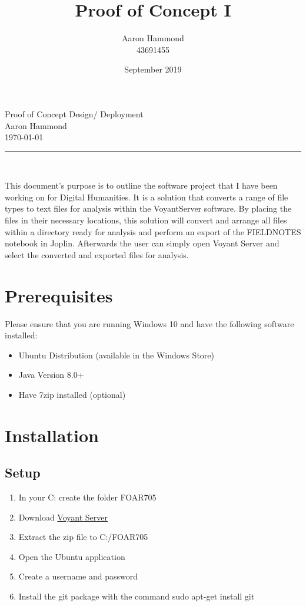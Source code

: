 \documentclass{article}
\title{Proof of Concept I}
\author{Aaron Hammond\\43691455}
\date{September 2019}
\newcommand\HRule{\rule{\textwidth}{1pt}} %
\begin{document}
\begin{center}
\huge{Proof of Concept Design/ Deployment}\\[0.4cm]
\huge{Aaron Hammond}\\[0.3cm]
\large{\today}\\[0.4cm]

\HRule \\[1cm]
\end{center}


This document's purpose is to outline the software project that I have been working on for Digital Humanities. It is a solution that converts a range of file types to text files for analysis within the VoyantServer software. By placing the files in their necessary locations, this solution will convert and arrange all files within a directory ready for analysis and perform an export of the FIELDNOTES notebook in Joplin. Afterwards the user can simply open Voyant Server and select the converted and exported files for analysis.

\section{Prerequisites}
Please ensure that you are running Windows 10 and have the following software installed:
\begin{itemize}
    \item Ubuntu Distribution (available in the Windows Store)
    \item Java Version 8.0+
    \item Have 7zip installed (optional)
    
\end{itemize}

\section{Installation}
\subsection{Setup}
\begin{enumerate}
    \item In your C: create the folder FOAR705
    \item Download \href{http://docs.voyant-tools.org/resources/run-your-own/voyant-server/#download}{Voyant Server}
    \item Extract the zip file to C:/FOAR705
    \item Open the Ubuntu application
    \item Create a username and password
    \item Install the git package with the command sudo apt-get install git
\end{enumerate}
\end{document}
